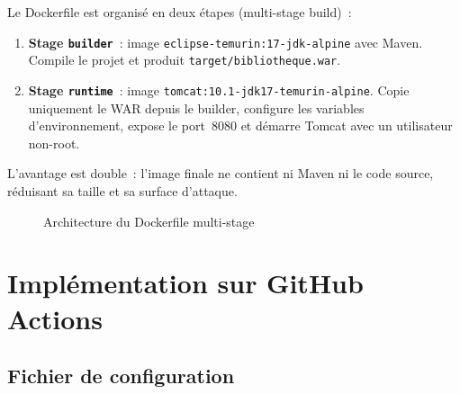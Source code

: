 \documentclass[12pt,a4paper]{report}
\begin{document}
Le Dockerfile est organisé en deux étapes (multi-stage build)~:

\begin{enumerate}
  \item \textbf{Stage \texttt{builder}}~: image \texttt{eclipse-temurin:17-jdk-alpine}
        avec Maven. Compile le projet et produit \texttt{target/bibliotheque.war}.
  \item \textbf{Stage \texttt{runtime}}~: image \texttt{tomcat:10.1-jdk17-temurin-alpine}.
        Copie uniquement le WAR depuis le builder, configure les variables
        d'environnement, expose le port~8080 et démarre Tomcat avec un
        utilisateur non-root.
\end{enumerate}

L'avantage est double~: l'image finale ne contient ni Maven ni le code source,
réduisant sa taille et sa surface d'attaque.

\begin{figure}[h!]
\centering
{}
\caption{Architecture du Dockerfile multi-stage}
\label{fig:dockerfile-multistage}
\end{figure}

\chapter{Implémentation sur GitHub Actions}
\label{ch:gha}

\section{Fichier de configuration}
\end{document}
